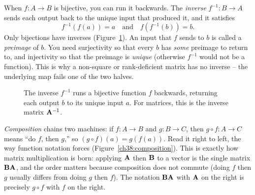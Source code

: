 When $f:A\to B$ is bijective, you can run it backwards. The \emph{inverse} $f^{-1}:B\to A$
sends each output back to the unique input that produced it, and it satisfies
\[
  f^{-1}(f(a)) = a \quad\text{and}\quad f(f^{-1}(b)) = b.
\]
Only bijections have inverses (Figure~\ref{ch38:inverse}). An input that $f$ sends to $b$ is called a
\emph{preimage} of $b$. You need surjectivity so that every $b$ has \emph{some}
preimage to return to, and injectivity so that the preimage is \emph{unique} (otherwise
$f^{-1}$ would not be a function). This is why a non-square or
rank-deficient matrix has no inverse -- the underlying map fails one of the two halves.

\begin{figure}[H]
\centering
{}
\caption{The inverse $f^{-1}$ runs a bijective function $f$ backwards, returning each output $b$ to its unique input $a$. For matrices, this is the inverse matrix $\mathbf{A}^{-1}$.}
\label{ch38:inverse}
\end{figure}

\emph{Composition} chains two machines: if $f:A\to B$ and $g:B\to C$, then $g \circ f :
A \to C$ means ``do $f$, then $g$,'' so $(g\circ f)(a) = g(f(a))$. Read it right to left,
the way function notation forces (Figure~\ref{ch38:composition}). This is exactly how
matrix multiplication is born: applying $\mathbf{A}$ then $\mathbf{B}$ to a vector is the single
matrix $\mathbf{B}\mathbf{A}$, and the order matters because composition does not commute (doing
$f$ then $g$ usually differs from doing $g$ then $f$). The
notation $\mathbf{B}\mathbf{A}$ with $\mathbf{A}$ on the right is precisely $g\circ f$ with $f$ on
the right.


